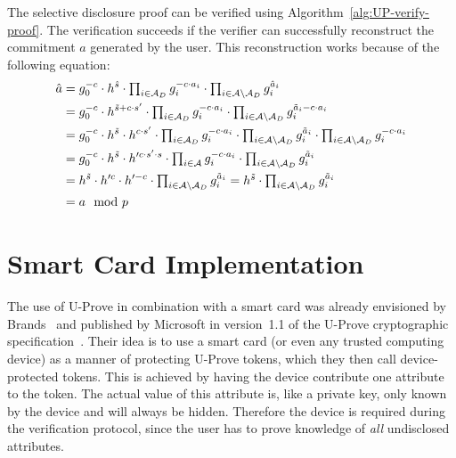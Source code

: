 The selective disclosure proof can be verified using
Algorithm~\ref{alg:UP-verify-proof}. The verification succeeds if the verifier
can successfully reconstruct the commitment $a$ generated by the user. This
reconstruction works because of the following equation:
\begin{align*}
  \hat{a}
  & = g_0^{-c} \cdot h^{\hat{s}}
    \cdot \textstyle\prod_{i \in \mathcal{A}_D} g_i^{-c \cdot a_i}
    \cdot \textstyle\prod_{i \in \mathcal{A} \setminus \mathcal{A}_D} g_i^{\hat{a}_i} \\
  & = g_0^{-c} \cdot h^{\tilde{s} + c \cdot s'}
    \cdot \textstyle\prod_{i \in \mathcal{A}_D} g_i^{-c \cdot a_i}
    \cdot \textstyle\prod_{i \in \mathcal{A} \setminus \mathcal{A}_D} g_i^{\tilde{a}_i - c \cdot a_i} \\
  & = g_0^{-c} \cdot h^{\tilde{s}} \cdot h^{c \cdot s'}
    \cdot \textstyle\prod_{i \in \mathcal{A}_D} g_i^{-c \cdot a_i}
    \cdot \textstyle\prod_{i \in \mathcal{A} \setminus \mathcal{A}_D} g_i^{\tilde{a}_i}
    \cdot \textstyle\prod_{i \in \mathcal{A} \setminus \mathcal{A}_D} g_i^{- c \cdot a_i} \\
  & = g_0^{-c} \cdot h^{\tilde{s}} \cdot h'^{c \cdot s' \cdot s}
    \cdot \textstyle\prod_{i \in \mathcal{A}} g_i^{-c \cdot a_i}
    \cdot \textstyle\prod_{i \in \mathcal{A} \setminus \mathcal{A}_D} g_i^{\tilde{a}_i} \\
  & = h^{\tilde{s}} \cdot h'^{c} \cdot h'^{-c}
    \cdot \textstyle\prod_{i \in \mathcal{A} \setminus \mathcal{A}_D} g_i^{\tilde{a}_i}
  = h^{\tilde{s}}
    \cdot \textstyle\prod_{i \in \mathcal{A} \setminus \mathcal{A}_D} g_i^{\tilde{a}_i} \\
  & = a \mod p
\end{align*}


\section{Smart Card Implementation}\label{sec:UP-smartcard}

The use of U-Prove in combination with a smart card was already envisioned by
Brands~\cite{Brands2000} and published by Microsoft in version~1.1 of the
U-Prove cryptographic specification~\cite{U-Prove_Crypto2011}. Their idea is to
use a smart card (or even any trusted computing device) as a manner of
protecting U-Prove tokens, which they then call device-protected tokens. This is
achieved by having the device contribute one attribute to the token. The actual
value of this attribute is, like a private key, only known by the device and
will always be hidden. Therefore the device is required during the verification
protocol, since the user has to prove knowledge of \emph{all} undisclosed
attributes.

